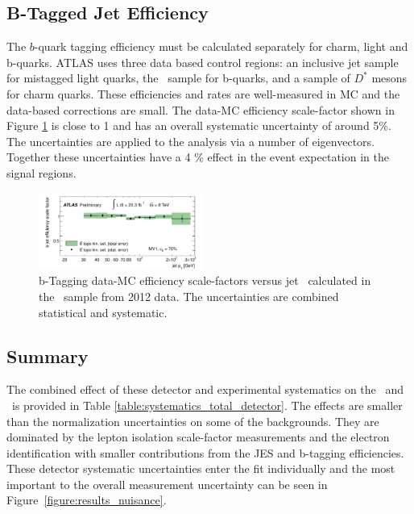 \subsection{B-Tagged Jet Efficiency}

The $b$-quark tagging efficiency must be calculated separately for charm, light and b-quarks. ATLAS uses three data based control regions: an inclusive jet sample for mistagged light quarks\cite{mistagratecalibration}, the \ttbar\ sample for b-quarks\cite{bjetcalibration}, and a sample of $D^{*}$ mesons for charm quarks\cite{cjetcalibration}. These efficiencies and rates are well-measured in MC and the data-based corrections are small. The data-MC efficiency scale-factor shown in Figure \ref{figure:systematics_b} is close to 1 and has an overall systematic uncertainty of around 5\%. The uncertainties are applied to the analysis via a number of eigenvectors. Together these uncertainties have a 4 \% effect in the event expectation in the signal regions. 

\begin{figure}[htbp]
\begin{center}
\includegraphics[width=0.48\textwidth]{figs/systematics/ttbartopo}
\caption{b-Tagging data-MC efficiency scale-factors versus jet \pt\ calculated in the \ttbar\ sample from 2012 data. The uncertainties are combined statistical and systematic.} 
\label{figure:systematics_b}
\end{center}
\end{figure}


\subsection{Summary}

The combined effect of these detector and experimental systematics on the \ttV\ and \tth\ is provided in Table \ref{table:systematics_total_detector}. The effects are smaller than the normalization uncertainties on some of the backgrounds. They are dominated by the lepton isolation scale-factor measurements and the electron identification with smaller contributions from the JES and b-tagging efficiencies. These detector systematic uncertainties enter the fit individually and the most important to the overall measurement uncertainty can be seen in Figure~\ref{figure:results_nuisance}.

